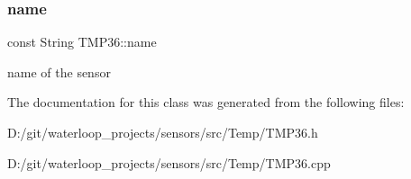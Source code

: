\subsubsection{\texorpdfstring{name}{name}}
{\footnotesize\ttfamily const String T\+M\+P36\+::name\hspace{0.3cm}{\ttfamily [private]}}

name of the sensor 

The documentation for this class was generated from the following files\+:\begin{DoxyCompactItemize}
\item 
D\+:/git/waterloop\+\_\+projects/sensors/src/\+Temp/T\+M\+P36.\+h\item 
D\+:/git/waterloop\+\_\+projects/sensors/src/\+Temp/T\+M\+P36.\+cpp\end{DoxyCompactItemize}
